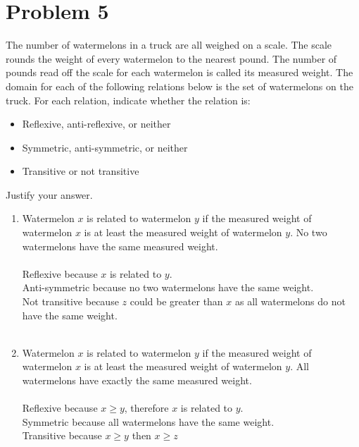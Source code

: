 \documentclass{amsart}
\theoremstyle{definition}
\theoremstyle{Exercise}
\theoremstyle{remark}
\theoremstyle{rule}
\numberwithin{equation}{section}
\begin{document}
\section*{Problem 5}

The number of watermelons in a truck are all weighed on a scale. The scale rounds the weight of every watermelon to the nearest pound. The number of pounds read off the scale for each watermelon is called its measured weight. The domain for each of the following relations below is the set of watermelons on the truck. For each relation, indicate whether the relation is:
\\
\begin{itemize}
  \item Reflexive, anti-reflexive, or neither
  \item Symmetric, anti-symmetric, or neither
  \item Transitive or not transitive
\end{itemize}
Justify your answer.\\

\begin{enumerate}[label=(\alph*)]
\item Watermelon $x$ is related to watermelon $y$ if the measured weight of watermelon $x$ is at least the measured weight of watermelon $y$. No two watermelons have the same measured weight.\\\\
Reflexive because $x$ is related to $y$.\\
Anti-symmetric because no two watermelons have the same weight.\\
Not transitive because $z$ could be greater than $x$ as all watermelons do not have the same weight.
\\\\
\item Watermelon $x$ is related to watermelon $y$ if the measured weight of watermelon $x$ is at least the measured weight of watermelon $y$. All watermelons have exactly the same measured weight.\\\\
Reflexive because  $x \geq y$, therefore $x$ is related to $y$.\\
Symmetric because all watermelons have the same weight.\\
Transitive because $x \geq y$ then $x \geq z$
\\\\
\end{enumerate}
 \newpage
\end{document}
